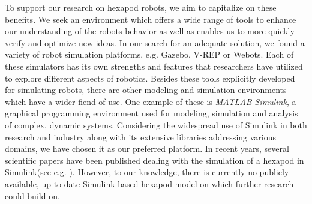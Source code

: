 To support our research on hexapod robots, we aim to capitalize on these benefits.
We seek an environment which offers a wide range of tools to enhance our understanding of the robots behavior as well as enables us to more quickly verify and optimize new ideas.
In our search for an adequate solution, we found a variety of robot simulation platforms, e.g. Gazebo, V-REP or Webots. 
Each of these simulators has its own strengths and features that researchers have utilized to explore different aspects of robotics.
Besides these tools explicitly developed for simulating robots, there are other modeling and simulation environments which have a wider fiend of use.
One example of these is \textit{MATLAB Simulink\textsuperscript{\textregistered}}, a graphical programming environment used for modeling, simulation and analysis of complex, dynamic systems.
Considering the widespread use of Simulink in both research and industry along with its extensive libraries addressing various domains, we have chosen it as our preferred platform.
In recent years, several scientific papers have been published dealing with the simulation of a hexapod in Simulink(see e.g. \cite{tanaka2019development, barai2013smart, atify2019propelling}).
However, to our knowledge, there is currently no publicly available, up-to-date Simulink-based hexapod model on which further research could build on.



